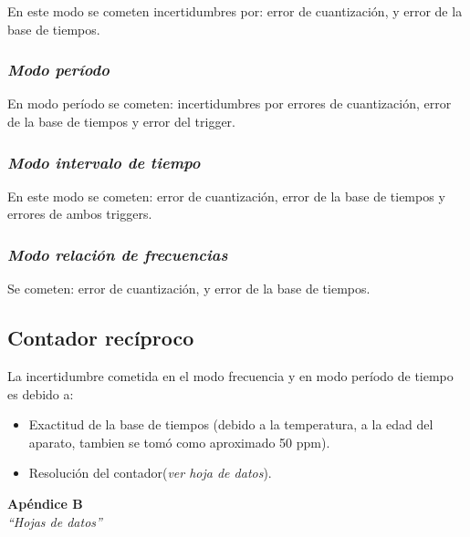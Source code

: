 \documentclass{article}
\begin{document}
En este modo se cometen incertidumbres por: error de cuantización, y error de la base de tiempos.
\medskip

\subsubsection{\textit{Modo período}}

En modo período se cometen: incertidumbres por errores de cuantización, error de la base de tiempos y error del trigger.
\medskip

\subsubsection{\textit{Modo intervalo de tiempo}}

En este modo se cometen: error de cuantización, error de la base de tiempos y errores de ambos triggers.
\medskip

\subsubsection{\textit{Modo relación de frecuencias}}

Se cometen: error de cuantización, y error de la base de tiempos.
\bigskip


\subsection{\textbf{Contador recíproco}}

La incertidumbre cometida en el modo frecuencia y en modo período de tiempo es debido a:\smallskip

\begin{itemize}
	\itemsep=3pt \topsep=0pt \partopsep=0pt \parskip=0pt \parsep=0pt
	
	\item{Exactitud de la base de tiempos (debido a la temperatura, a la edad del aparato, tambien se tomó como aproximado 50 ppm).}
	\item{Resolución del contador(\textit{ver hoja de datos}).}
\end{itemize}

\bigskip


\newpage



\newpage
\vspace*{4cm}
\begin{center}
	\textbf{\Huge{Apéndice B}} \\
	\bigskip\bigskip
	\Large{\textit{``Hojas de datos''}}
\end{center}


\newpage \textit{}
\end{document}
